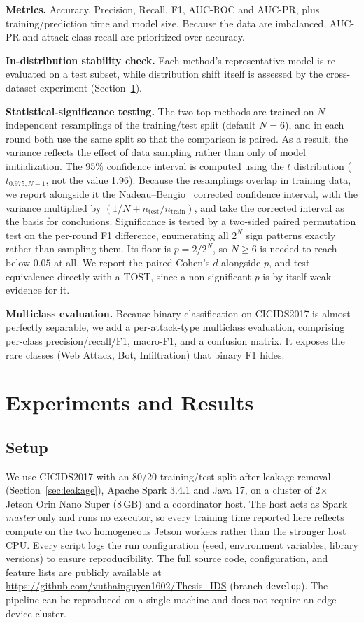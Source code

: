 \documentclass[11pt,conference,a4paper]{IEEEtran}
\begin{document}
\textbf{Metrics.} Accuracy, Precision, Recall, F1, AUC-ROC and AUC-PR, plus training/prediction time and model size. Because the data are imbalanced, AUC-PR and attack-class recall are prioritized over accuracy.

\textbf{In-distribution stability check.} Each method's representative model is re-evaluated on a test subset, while distribution shift itself is assessed by the cross-dataset experiment (Section~\ref{sec:exp}).

\textbf{Statistical-significance testing.} The two top methods are trained on $N$ independent resamplings of the training/test split (default $N{=}6$), and in each round both use the same split so that the comparison is paired. As a result, the variance reflects the effect of data sampling rather than only of model initialization. The 95\% confidence interval is computed using the $t$ distribution ($t_{0.975,N-1}$, not the value 1.96). Because the resamplings overlap in training data, we report alongside it the Nadeau--Bengio~\cite{nadeau2003inference} corrected confidence interval, with the variance multiplied by $(1/N + n_{\text{test}}/n_{\text{train}})$, and take the corrected interval as the basis for conclusions. Significance is tested by a two-sided paired permutation test on the per-round F1 difference, enumerating all $2^N$ sign patterns exactly rather than sampling them. Its floor is $p = 2/2^N$, so $N \geq 6$ is needed to reach below $0.05$ at all. We report the paired Cohen's $d$ alongside $p$, and test equivalence directly with a TOST, since a non-significant $p$ is by itself weak evidence for it.

\textbf{Multiclass evaluation.} Because binary classification on CICIDS2017 is almost perfectly separable, we add a per-attack-type multiclass evaluation, comprising per-class precision/recall/F1, macro-F1, and a confusion matrix. It exposes the rare classes (Web Attack, Bot, Infiltration) that binary F1 hides.

\section{Experiments and Results}
\label{sec:exp}

\subsection{Setup}

We use CICIDS2017 with an 80/20 training/test split after leakage removal (Section~\ref{sec:leakage}), Apache Spark 3.4.1 and Java 17, on a cluster of 2$\times$ Jetson Orin Nano Super (8\,GB) and a coordinator host. The host acts as Spark \emph{master} only and runs no executor, so every training time reported here reflects compute on the two homogeneous Jetson workers rather than the stronger host CPU. Every script logs the run configuration (seed, environment variables, library versions) to ensure reproducibility. The full source code, configuration, and feature lists are publicly available at \url{https://github.com/vuthainguyen1602/Thesis_IDS} (branch \texttt{develop}). The pipeline can be reproduced on a single machine and does not require an edge-device cluster.
\end{document}
